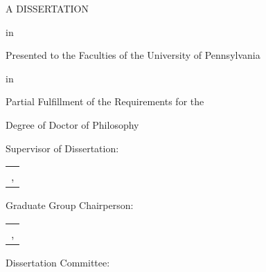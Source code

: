 \begin{titlepage}
	\thispagestyle{empty} %
	\begin{center}

	\onehalfspacing

	\mytitle

	\myauthor

	A DISSERTATION

	in 

	\mydepartment 


	Presented to the Faculties of the University of Pennsylvania

	in 

	Partial Fulfillment of the Requirements for the

	Degree of Doctor of Philosophy

	\myyear

	\end{center}

	\vfill %

	\begin{flushleft}

	Supervisor of Dissertation:\\[\signatures] %

	\setlength\parindent{2em}
	\renewcommand{\tabcolsep}{0 pt}
	\begin{tabularx}{\maxlen}{l}
	\toprule
	\mysupervisorname, \mysupervisortitle\\ %
	\end{tabularx}
	\setlength\parindent{0em}

	Graduate Group Chairperson:\\[\signatures] %

	\setlength\parindent{2em}
	\begin{tabularx}{\maxlen}{l}
	\toprule
	\gradchairname, \gradchairtitle\\ %
	\end{tabularx}
	\setlength\parindent{0em}
	\singlespacing

	Dissertation Committee: %

	\setlength\parindent{2em}
	\mycommittee
	\setlength\parindent{0em}


	\end{flushleft}
\end{titlepage}

